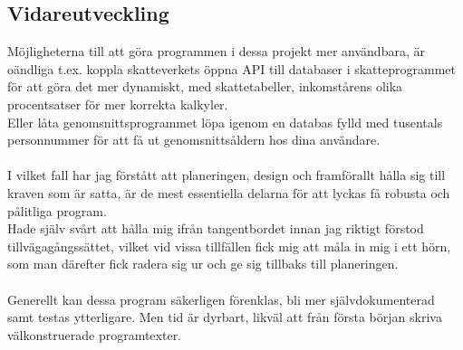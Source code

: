\documentclass[../main.tex]{subfiles}
\begin{document}
\subsection{Vidareutveckling}
Möjligheterna till att göra programmen i dessa projekt mer användbara, är oändliga
t.ex. koppla skatteverkets öppna API till databaser i skatteprogrammet för att göra det mer dynamiskt, med skattetabeller, inkomstårens olika procentsatser för mer korrekta kalkyler.\\
Eller låta genomsnittsprogrammet löpa igenom en databas fylld med tusentals personnummer för att få ut genomsnittsåldern hos dina användare.\\
\\
I vilket fall har jag förstått att planeringen, design och framförallt hålla sig till kraven som är satta, är de mest essentiella delarna för att lyckas få robusta och pålitliga program.\\
Hade själv svårt att hålla mig ifrån tangentbordet innan jag riktigt förstod tillvägagångssättet, vilket vid vissa tillfällen fick mig att måla in mig i ett hörn, som man därefter fick radera sig ur och ge sig tillbaks till planeringen.\\
\\
Generellt kan dessa program säkerligen förenklas, bli mer självdokumenterad samt testas ytterligare. Men tid är dyrbart, likväl att från första början skriva välkonstruerade programtexter.
\end{document}
